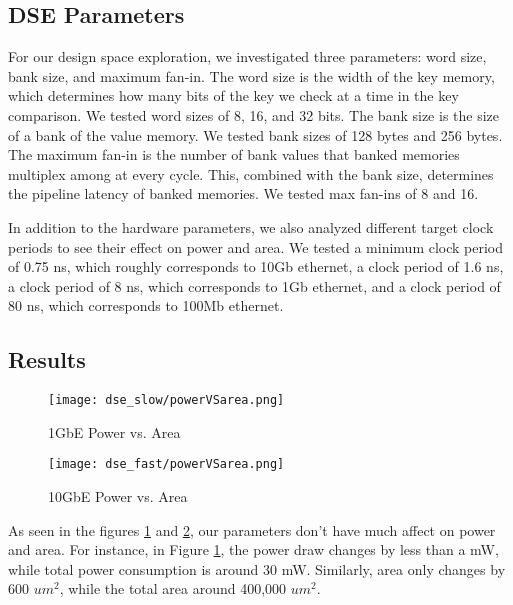 \subsection{DSE Parameters}

For our design space exploration, we investigated three parameters: word size,
bank size, and maximum fan-in. The word size is the width of the key
memory, which determines how many bits of the key we check at a time in the
key comparison. We tested word sizes of 8, 16, and 32 bits. The bank size is
the size of a bank of the value memory. We tested bank sizes of 128 bytes and
256 bytes. The maximum fan-in is the number of bank values that banked
memories multiplex among at every cycle. This, combined with the bank size,
determines the pipeline latency of banked memories. We tested max fan-ins of
8 and 16.

In addition to the hardware parameters, we also analyzed different target clock
periods to see their effect on power and area. We tested a minimum clock period
of 0.75 ns, which roughly corresponds to 10Gb ethernet, a clock period of 1.6 ns,
a clock period of 8 ns, which corresponds to 1Gb ethernet, and a clock period
of 80 ns, which corresponds to 100Mb ethernet.

\subsection{Results}

\begin{figure}
    \begin{center}
        \texttt{[image: dse\_slow/powerVSarea.png]}
        \caption{1GbE Power vs. Area}
        \label{fig:slow-pva}
    \end{center}
\end{figure}

\begin{figure}
    \begin{center}
        \texttt{[image: dse\_fast/powerVSarea.png]}
        \caption{10GbE Power vs. Area}
        \label{fig:fast-pva}
    \end{center}
\end{figure}

As seen in the figures \ref{fig:slow-pva} and \ref{fig:fast-pva}, our
parameters don't have much affect on power and area. For instance, in Figure
\ref{fig:slow-pva}, the power draw changes by less than a mW, while total
power consumption is around 30 mW. Similarly, area only changes by 600 \(um^2\),
while the total area around 400,000 \(um^2\).

